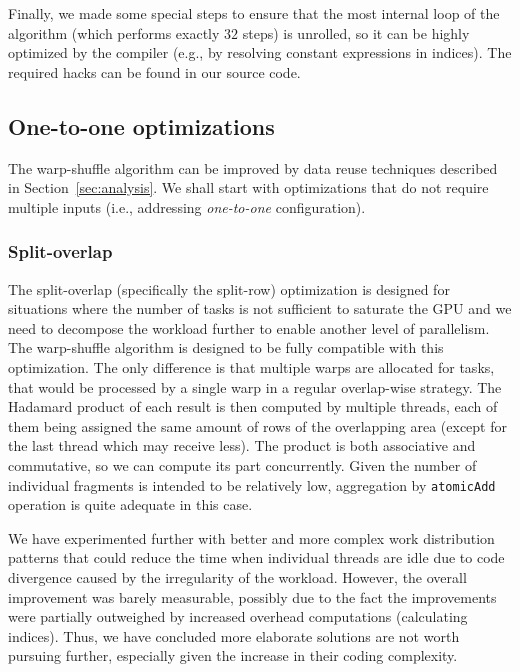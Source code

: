 Finally, we made some special steps to ensure that the most internal loop of the algorithm (which performs exactly $32$ steps) is unrolled, so it can be highly optimized by the compiler (e.g., by resolving constant expressions in indices). The required hacks can be found in our source code.



\subsection{One-to-one optimizations}

The warp-shuffle algorithm can be improved by data reuse techniques described in Section~\ref{sec:analysis}. We shall start with optimizations that do not require multiple inputs (i.e., addressing \textit{one-to-one} configuration).

\subsubsection{Split-overlap}\label{sec:split-overlap-alg}

The split-overlap (specifically the split-row) optimization is designed for situations where the number of tasks is not sufficient to saturate the GPU and we need to decompose the workload further to enable another level of parallelism. The warp-shuffle algorithm is designed to be fully compatible with this optimization. The only difference is that multiple warps are allocated for tasks, that would be processed by a single warp in a regular overlap-wise strategy. The Hadamard product of each result is then computed by multiple threads, each of them being assigned the same amount of rows of the overlapping area (except for the last thread which may receive less). The product is both associative and commutative, so we can compute its part concurrently. Given the number of individual fragments is intended to be relatively low, aggregation by \texttt{atomicAdd} operation is quite adequate in this case.

We have experimented further with better and more complex work distribution patterns that could reduce the time when individual threads are idle due to code divergence caused by the irregularity of the workload. However, the overall improvement was barely measurable, possibly due to the fact the improvements were partially outweighed by increased overhead computations (calculating indices). Thus, we have concluded more elaborate solutions are not worth pursuing further, especially given the increase in their coding complexity.


